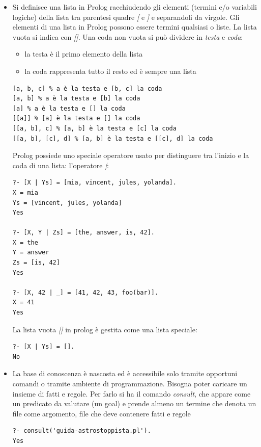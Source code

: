 \documentclass[a4paper,12pt, oneside]{book}
\begin{document}
\begin{itemize}
\begin{esempio}
\begin{verbatim}
aula(Corso, Luogo) :- corso(Corso, _, Luogo, _).
\end{verbatim}
oppure ancora i predicati che abbiamo definito a partire dalle relazioni con 6 o 4 campi possono essere ricodificate con predicati binari:
\begin{verbatim}
giorno(linguaggi, martedì).
orario(linguaggi, '9:30').
edificio(linguaggi, 'U4').
aula(linguaggi, 3).
docente(linguaggi, antoniotti).
\end{verbatim}
La relazioni a 6 o 4 argomenti possono essere ricostruite in a partire da queste relazioni binarie. La costruzione di schemi \textit{RDF/XML} (e, a volte,\textit{ SQL}) corrisponde a questa operazione di ri-rappresentazione
\end{esempio}
\item Si definisce una lista in Prolog racchiudendo gli elementi (termini e/o variabili logiche) della lista tra parentesi quadre \textit{[} e \textit{]} e separandoli da virgole. Gli elementi di una lista in Prolog possono essere termini
qualsiasi o liste. La lista vuota si indica con \textit{[]}. Una coda non vuota si può dividere in \textit{testa} e \textit{coda}:
\begin{itemize}
\item la testa è il primo elemento della lista
\item la coda rappresenta tutto il resto ed è sempre una lista
\end{itemize}
\begin{verbatim}
[a, b, c] % a è la testa e [b, c] la coda
[a, b] % a è la testa e [b] la coda
[a] % a è la testa e [] la coda
[[a]] % [a] è la testa e [] la coda
[[a, b], c] % [a, b] è la testa e [c] la coda
[[a, b], [c], d] % [a, b] è la testa e [[c], d] la coda
\end{verbatim}
Prolog possiede uno speciale operatore usato per distinguere tra l'inizio e la coda di una lista: l'operatore \textit{|}:
\begin{verbatim}
?- [X | Ys] = [mia, vincent, jules, yolanda].
X = mia
Ys = [vincent, jules, yolanda]
Yes

?- [X, Y | Zs] = [the, answer, is, 42].
X = the
Y = answer
Zs = [is, 42]
Yes

?- [X, 42 | _] = [41, 42, 43, foo(bar)].
X = 41
Yes
\end{verbatim}
La lista vuota \textit{[]} in prolog è gestita come una lista speciale:
\begin{verbatim}
?- [X | Ys] = [].
No
\end{verbatim}
\item La base di conoscenza è nascosta ed è accessibile solo tramite opportuni comandi o tramite ambiente di programmazione. Bisogna poter caricare un insieme di fatti e regole. Per farlo si ha il comando \textit{consult}, che appare come un predicato da valutare (un goal) e prende almeno un termine che denota un file come argomento, file che deve contenere fatti e regole
\begin{verbatim}
?- consult('guida-astrostoppista.pl').
Yes


\end{verbatim}
\end{itemize}
\end{document}
